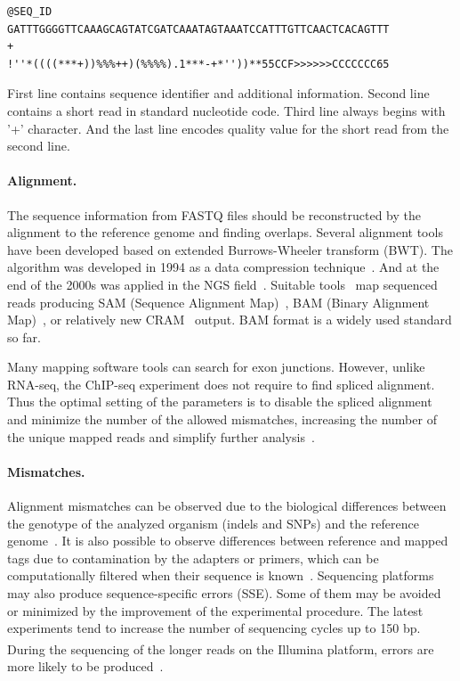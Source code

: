 \begin{verbatim}
@SEQ_ID
GATTTGGGGTTCAAAGCAGTATCGATCAAATAGTAAATCCATTTGTTCAACTCACAGTTT
+
!''*((((***+))%%%++)(%%%%).1***-+*''))**55CCF>>>>>>CCCCCCC65
\end{verbatim}

First line contains sequence identifier and additional information.
Second line contains a short read in standard nucleotide code.
Third line always begins with '+' character.
And the last line encodes quality value for the short read from the second line.


\paragraph{Alignment.}
The sequence information from FASTQ files should be reconstructed by the alignment to the reference genome and finding overlaps.
Several alignment tools have been developed based on extended Burrows-Wheeler transform (BWT). 
The algorithm was developed in 1994 as a data compression technique~\cite{li2009fast, siren2014indexing}.
And at the end of the 2000s was applied in the NGS field~\cite{simpson2010efficient}.
Suitable tools~\cite{langmead2009ultrafast, li2009fast, kim2019graph} map sequenced reads producing  SAM (Sequence Alignment Map)~\cite{sam}, BAM (Binary Alignment Map)~\cite{sam}, or relatively new CRAM~\cite{cram} output. 
BAM format is a widely used standard so far.

Many mapping software tools can search for exon junctions. 
However, unlike RNA-seq, the ChIP-seq experiment does not require to find spliced alignment.
Thus the optimal setting of the parameters is to disable the spliced alignment and minimize the number of the allowed mismatches, increasing the number of the unique mapped reads and simplify further analysis~\cite{derrien2012fast}.

\paragraph{Mismatches.}
Alignment mismatches can be observed due to the biological differences between the genotype of the analyzed organism (indels and SNPs) and the reference genome~\cite{park2009chip}.
It is also possible to observe differences between reference and mapped tags due to contamination by the adapters or primers, which can be computationally filtered when their sequence is known~\cite{nakamura2011sequence}. 
Sequencing platforms may also produce sequence-specific errors (SSE). 
Some of them may be avoided or minimized by the improvement of the experimental procedure. 
The latest experiments tend to increase the number of sequencing cycles up to 150 bp. 
During the sequencing of the longer reads on the Illumina\textsuperscript{\texttrademark} platform, errors are more likely to be produced~\cite{nakamura2011sequence}.

